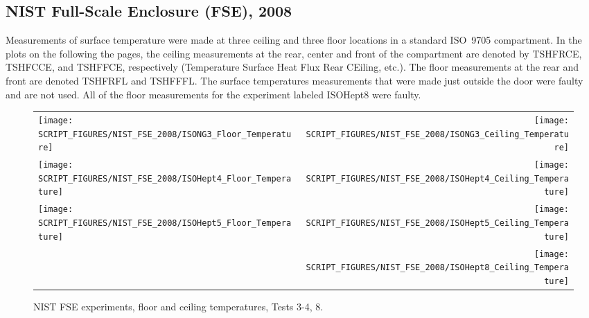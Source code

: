 \clearpage

\subsection{NIST Full-Scale Enclosure (FSE), 2008}

Measurements of surface temperature were made at three ceiling and three floor locations in a standard ISO~9705 compartment. In the plots on the following the pages, the ceiling measurements at the rear, center and front of the compartment are denoted by TSHFRCE, TSHFCCE, and TSHFFCE, respectively (Temperature Surface Heat Flux Rear CEiling, etc.). The floor measurements at the rear and front are denoted TSHFRFL and TSHFFFL. The surface temperatures measurements that were made just outside the door were faulty and are not used. All of the floor measurements for the experiment labeled ISOHept8 were faulty.

\newpage

\begin{figure}[p]
\begin{tabular*}{\textwidth}{l@{\extracolsep{\fill}}r}
\texttt{[image: SCRIPT\_FIGURES/NIST\_FSE\_2008/ISONG3\_Floor\_Temperature]} &
\texttt{[image: SCRIPT\_FIGURES/NIST\_FSE\_2008/ISONG3\_Ceiling\_Temperature]} \\
\texttt{[image: SCRIPT\_FIGURES/NIST\_FSE\_2008/ISOHept4\_Floor\_Temperature]} &
\texttt{[image: SCRIPT\_FIGURES/NIST\_FSE\_2008/ISOHept4\_Ceiling\_Temperature]} \\
\texttt{[image: SCRIPT\_FIGURES/NIST\_FSE\_2008/ISOHept5\_Floor\_Temperature]} &
\texttt{[image: SCRIPT\_FIGURES/NIST\_FSE\_2008/ISOHept5\_Ceiling\_Temperature]} \\
 &
\texttt{[image: SCRIPT\_FIGURES/NIST\_FSE\_2008/ISOHept8\_Ceiling\_Temperature]}
\end{tabular*}
\caption{NIST FSE experiments, floor and ceiling temperatures, Tests 3-4, 8.}
\label{NIST_FSE_2008_Surface_Temp_1}
\end{figure}

